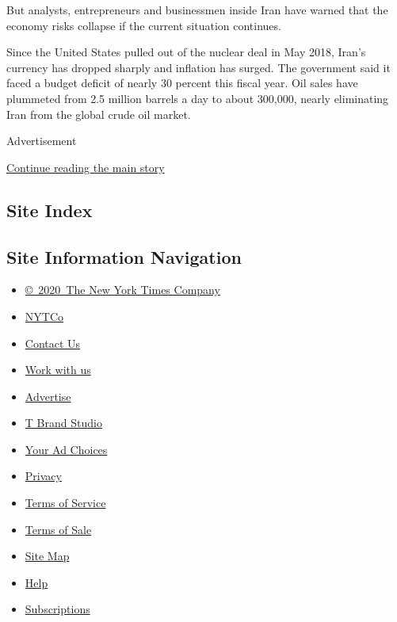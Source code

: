 But analysts, entrepreneurs and businessmen inside Iran have warned that
the economy risks collapse if the current situation continues.

Since the United States pulled out of the nuclear deal in May 2018,
Iran's currency has dropped sharply and inflation has surged. The
government said it faced a budget deficit of nearly 30 percent this
fiscal year. Oil sales have plummeted from 2.5 million barrels a day to
about 300,000, nearly eliminating Iran from the global crude oil market.

Advertisement

\protect\hyperlink{after-bottom}{Continue reading the main story}

\hypertarget{site-index}{%
\subsection{Site Index}\label{site-index}}

\hypertarget{site-information-navigation}{%
\subsection{Site Information
Navigation}\label{site-information-navigation}}

\begin{itemize}
\tightlist
\item
  \href{https://help.nytimes.com/hc/en-us/articles/115014792127-Copyright-notice}{©~2020~The
  New York Times Company}
\end{itemize}

\begin{itemize}
\tightlist
\item
  \href{https://www.nytco.com/}{NYTCo}
\item
  \href{https://help.nytimes.com/hc/en-us/articles/115015385887-Contact-Us}{Contact
  Us}
\item
  \href{https://www.nytco.com/careers/}{Work with us}
\item
  \href{https://nytmediakit.com/}{Advertise}
\item
  \href{http://www.tbrandstudio.com/}{T Brand Studio}
\item
  \href{https://www.nytimes.com/privacy/cookie-policy\#how-do-i-manage-trackers}{Your
  Ad Choices}
\item
  \href{https://www.nytimes.com/privacy}{Privacy}
\item
  \href{https://help.nytimes.com/hc/en-us/articles/115014893428-Terms-of-service}{Terms
  of Service}
\item
  \href{https://help.nytimes.com/hc/en-us/articles/115014893968-Terms-of-sale}{Terms
  of Sale}
\item
  \href{https://spiderbites.nytimes.com}{Site Map}
\item
  \href{https://help.nytimes.com/hc/en-us}{Help}
\item
  \href{https://www.nytimes.com/subscription?campaignId=37WXW}{Subscriptions}
\end{itemize}
